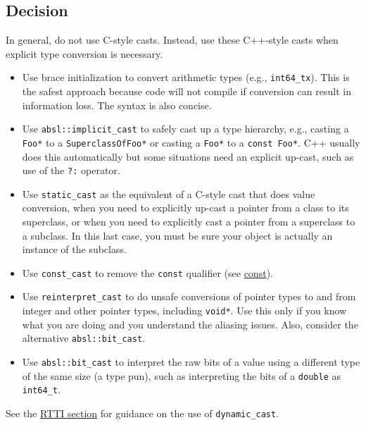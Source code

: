 \subsection{Decision}
In general, do not use C-style casts. Instead, use these C++-style casts when explicit type conversion is necessary.
\begin{itemize}
    \item Use brace initialization to convert arithmetic types (e.g., \texttt{int64_t{x}}). This is the safest approach because code will not compile if conversion can result in information loss. The syntax is also concise.
    \item Use \texttt{absl::implicit_cast} to safely cast up a type hierarchy, e.g., casting a \texttt{Foo*} to a \texttt{SuperclassOfFoo*} or casting a \texttt{Foo*} to a \texttt{const Foo*}. C++ usually does this automatically but some situations need an explicit up-cast, such as use of the \texttt{?:} operator.
    \item Use \texttt{static_cast} as the equivalent of a C-style cast that does value conversion, when you need to explicitly up-cast a pointer from a class to its superclass, or when you need to explicitly cast a pointer from a superclass to a subclass. In this last case, you must be sure your object is actually an instance of the subclass.
    \item Use \texttt{const_cast} to remove the \texttt{const} qualifier (see \hyperref[sec:use-of-const]{const}).
    \item Use \texttt{reinterpret_cast} to do unsafe conversions of pointer types to and from integer and other pointer types, including \texttt{void*}. Use this only if you know what you are doing and you understand the aliasing issues. Also, consider the alternative \texttt{absl::bit_cast}.
    \item Use \texttt{absl::bit_cast} to interpret the raw bits of a value using a different type of the same size (a type pun), such as interpreting the bits of a \texttt{double} as \texttt{int64_t}.
\end{itemize}

See the \hyperref[sec:run-time-type-information-(rtti)]{RTTI section} for guidance on the use of \texttt{dynamic_cast}.
